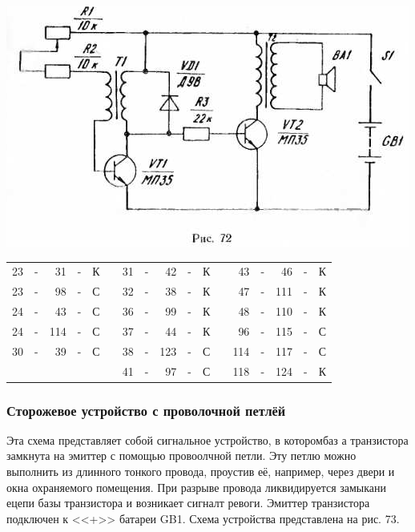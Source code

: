 \documentclass[12pt]{article}
\begin{document}
\includegraphics[scale=1, angle=0]{ekon3_073_1}

\vspace{1.5cm}

\hrulefill

\begin{tabular}{r c r c r p{2cm} r c r c r p{2cm} r c r c r}
 23 & - &  31 & - & К &     &  31 & - &  42 & - & К &    &  43 & - &  46 & - & К\\
 23 & - &  98 & - & С &     &  32 & - &  38 & - & К &    &  47 & - & 111 & - & К\\
 24 & - &  43 & - & С &     &  36 & - &  99 & - & К &    &  48 & - & 110 & - & К\\
 24 & - & 114 & - & С &     &  37 & - &  44 & - & К &    &  96 & - & 115 & - & С\\
 30 & - &  39 & - & С &     &  38 & - & 123 & - & С &    & 114 & - & 117 & - & С\\
    &   &     &   &   &     &  41 & - &  97 & - & С &    & 118 & - & 124 & - & К\\
\end{tabular}

\hrulefill

\newpage

\subsubsection{Сторожевое устройство с проволочной петлёй}

Эта схема представляет собой сигнальное устройство, в которомбаз а транзистора замкнута на эмиттер с помощью провоолчной петли. Эту петлю можно выполнить из длинного тонкого провода, проустив её, например, через двери и окна охраняемого помещения. При разрыве провода ликвидируется замыкани ецепи базы транзистора и возникает сигналт ревоги. Эмиттер транзистора подключен к <<+>> батареи GB1. Схема устройства представлена на рис. 73.
\end{document}
